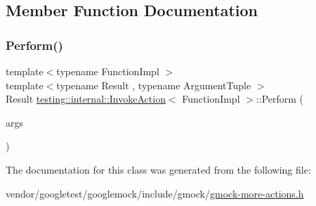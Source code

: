 \subsection{Member Function Documentation}
\mbox{\label{classtesting_1_1internal_1_1_invoke_action_af357ce691795b3520de1fda4ab8af8b2}} 
\subsubsection{\texorpdfstring{Perform()}{Perform()}}
{\footnotesize\ttfamily template$<$typename Function\+Impl $>$ \\
template$<$typename Result , typename Argument\+Tuple $>$ \\
Result \hyperlink{classtesting_1_1internal_1_1_invoke_action}{testing\+::internal\+::\+Invoke\+Action}$<$ Function\+Impl $>$\+::Perform (\begin{DoxyParamCaption}\item[{const Argument\+Tuple \&}]{args }\end{DoxyParamCaption})\hspace{0.3cm}{\ttfamily [inline]}}



The documentation for this class was generated from the following file\+:\begin{DoxyCompactItemize}
\item 
vendor/googletest/googlemock/include/gmock/\hyperlink{gmock-more-actions_8h}{gmock-\/more-\/actions.\+h}\end{DoxyCompactItemize}
